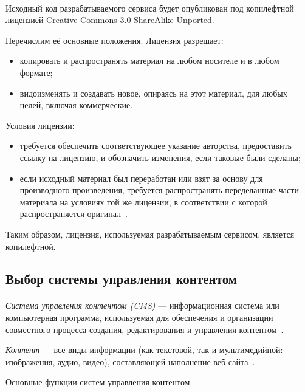 \paragraph{}
Исходный код разрабатываемого сервиса будет опубликован под копилефтной лицензией 
Creative Commons 3.0 ShareAlike Unported.

Перечислим её основные положения. Лицензия разрешает:
\begin{itemize}
\item копировать и распространять материал на любом носителе и в любом формате;
\item видоизменять и создавать новое, опираясь на этот материал, для любых целей, включая коммерческие.
\end{itemize}

Условия лицензии:
\begin{itemize}
\item требуется обеспечить соответствующее указание авторства, предоставить ссылку на лицензию,
  и обозначить изменения, если таковые были сделаны;
\item если исходный материал был переработан или взят за основу для производного произведения,
  требуется распространять переделанные части материала на условиях той же лицензии, 
  в соответствии с которой распространяется оригинал~\cite{cc_by_sa}.
\end{itemize}

Таким образом, лицензия, используемая разрабатываемым сервисом, является копилефтной. 

\subsection{Выбор системы управления контентом}
\label{ssec:choice_cms}

\paragraph{}
\textit{Система управления контентом (CMS)} --- информационная система или компьютерная программа,
используемая для обеспечения и организации совместного процесса создания,
редактирования и управления контентом~\cite{wiki_cms}.

\textit{Контент} --- все виды информации (как текстовой, так и мультимедийной: изображения, аудио, видео),
составляющей наполнение веб-сайта~\cite{wiki_content}.

Основные функции систем управления контентом:

